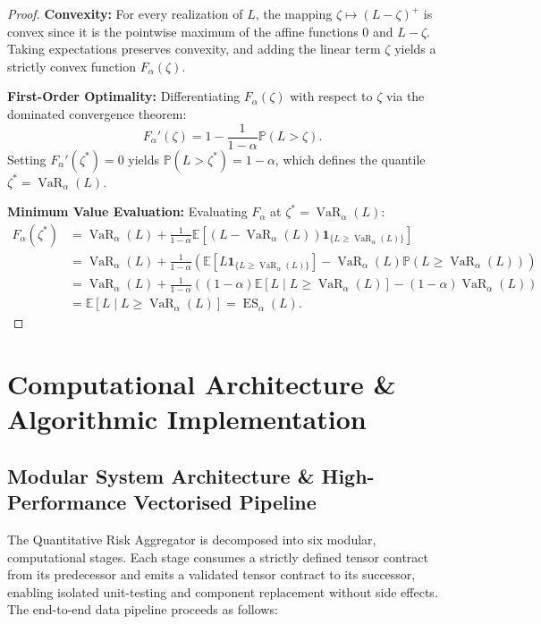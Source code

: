 \documentclass{article}
\theoremstyle{plain}
\theoremstyle{definition}
\theoremstyle{remark}
\begin{document}
\begin{proof}
\textbf{Convexity:} For every realization of $L$, the mapping $\zeta \mapsto (L - \zeta)^+$ is convex since it is the pointwise maximum of the affine functions $0$ and $L - \zeta$. Taking expectations preserves convexity, and adding the linear term $\zeta$ yields a strictly convex function $F_\alpha(\zeta)$.

\textbf{First-Order Optimality:} Differentiating $F_\alpha(\zeta)$ with respect to $\zeta$ via the dominated convergence theorem:
\begin{equation}
F_\alpha'(\zeta) = 1 - \frac{1}{1 - \alpha}\mathbb{P}(L > \zeta).
\end{equation}
Setting $F_\alpha'(\zeta^*) = 0$ yields $\mathbb{P}(L > \zeta^*) = 1 - \alpha$, which defines the quantile $\zeta^* = \operatorname{VaR}_\alpha(L)$.

\textbf{Minimum Value Evaluation:} Evaluating $F_\alpha$ at $\zeta^* = \operatorname{VaR}_\alpha(L)$:
\begin{align}
F_\alpha(\zeta^*) &= \operatorname{VaR}_\alpha(L) + \frac{1}{1 - \alpha}\mathbb{E}\left[(L - \operatorname{VaR}_\alpha(L))\mathbf{1}_{\{L \ge \operatorname{VaR}_\alpha(L)\}}\right] \nonumber \\
&= \operatorname{VaR}_\alpha(L) + \frac{1}{1 - \alpha}\left(\mathbb{E}\left[L\mathbf{1}_{\{L \ge \operatorname{VaR}_\alpha(L)\}}\right] - \operatorname{VaR}_\alpha(L)\mathbb{P}(L \ge \operatorname{VaR}_\alpha(L))\right) \nonumber \\
&= \operatorname{VaR}_\alpha(L) + \frac{1}{1 - \alpha}\left((1 - \alpha)\mathbb{E}\left[L \mid L \ge \operatorname{VaR}_\alpha(L)\right] - (1 - \alpha)\operatorname{VaR}_\alpha(L)\right) \nonumber \\
&= \mathbb{E}\left[L \mid L \ge \operatorname{VaR}_\alpha(L)\right] = \operatorname{ES}_\alpha(L).
\end{align}
\end{proof}

\section{Computational Architecture \& Algorithmic Implementation}

\subsection{Modular System Architecture \& High-Performance Vectorised Pipeline}
The Quantitative Risk Aggregator is decomposed into six modular, computational stages. Each stage consumes a strictly defined tensor contract from its predecessor and emits a validated tensor contract to its successor, enabling isolated unit-testing and component replacement without side effects. The end-to-end data pipeline proceeds as follows:
\end{document}
